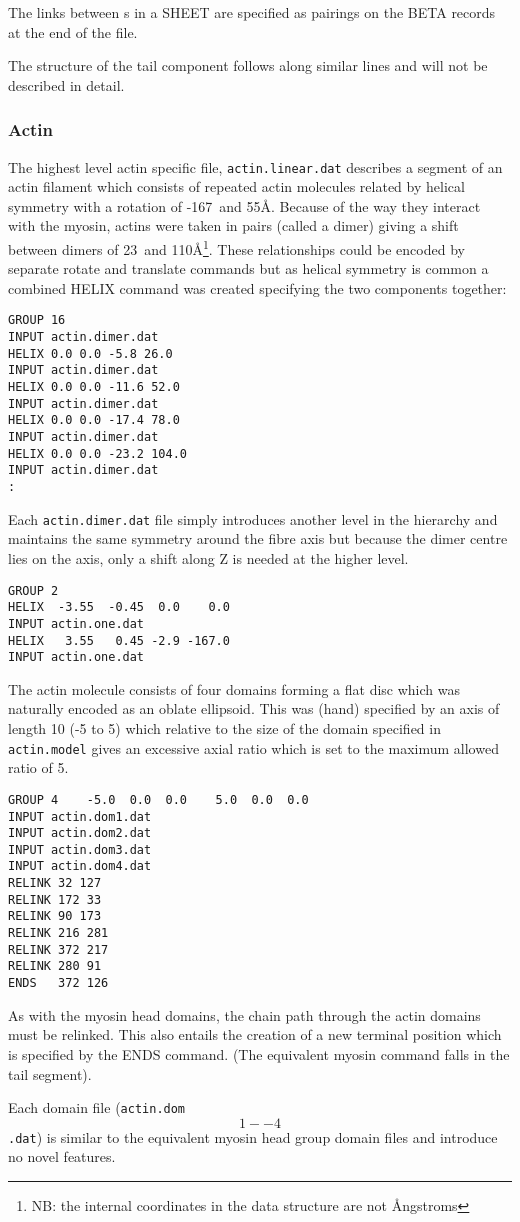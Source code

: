 The links between \Bs s in a SHEET are specified as pairings on the BETA
records at the end of the file.

The structure of the tail component follows along similar lines and will not
be described in detail.

\subsubsection{Actin}

The highest level actin specific file, {\tt actin.linear.dat} describes a segment
of an actin filament which consists of repeated actin molecules related by helical
symmetry with a rotation of -167\degre\ and 55\AA.  Because of the way they interact
with the myosin, actins were taken in pairs (called a dimer) giving a shift between
dimers of 23\degre\ and 110\AA\footnote{
NB: the internal coordinates in the data structure are not \AA ngstroms}.  
These relationships could be encoded by separate 
rotate and translate commands but as helical symmetry is common a combined HELIX
command was created specifying the two components together:

\begin{verbatim}
GROUP 16
INPUT actin.dimer.dat
HELIX 0.0 0.0 -5.8 26.0
INPUT actin.dimer.dat
HELIX 0.0 0.0 -11.6 52.0
INPUT actin.dimer.dat
HELIX 0.0 0.0 -17.4 78.0
INPUT actin.dimer.dat
HELIX 0.0 0.0 -23.2 104.0
INPUT actin.dimer.dat
:
\end{verbatim}

Each {\tt actin.dimer.dat} file simply introduces another level in the hierarchy
and maintains the same symmetry around the fibre axis but because the dimer centre lies on the
axis, only a shift along Z is needed at the higher level.

\begin{verbatim}
GROUP 2
HELIX  -3.55  -0.45  0.0    0.0
INPUT actin.one.dat
HELIX   3.55   0.45 -2.9 -167.0
INPUT actin.one.dat
\end{verbatim}

The actin molecule consists of four domains forming a flat disc which was naturally encoded
as an oblate ellipsoid.   This was (hand) specified by an axis of length 10 (-5 to 5) which
relative to the size of the domain specified in {\tt actin.model} gives an excessive axial ratio 
which is set to the maximum allowed ratio of 5.

\begin{verbatim}
GROUP 4    -5.0  0.0  0.0    5.0  0.0  0.0
INPUT actin.dom1.dat
INPUT actin.dom2.dat
INPUT actin.dom3.dat
INPUT actin.dom4.dat
RELINK 32 127
RELINK 172 33
RELINK 90 173
RELINK 216 281
RELINK 372 217
RELINK 280 91
ENDS   372 126
\end{verbatim}

As with the myosin head domains, the chain path through the actin domains must be relinked.
This also entails the creation of a new terminal position which is specified by the ENDS 
command.   (The equivalent myosin command falls in the tail segment).

Each domain file ({\tt actin.dom\[1--4\].dat}) is similar to the equivalent myosin head
group domain files and introduce no novel features.
